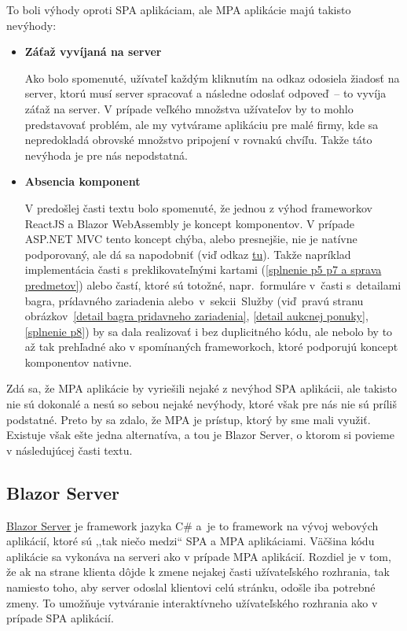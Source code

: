 To boli výhody oproti SPA aplikáciam, ale MPA aplikácie majú takisto nevýhody:

\begin{itemize}
\item \textbf{Záťaž vyvíjaná na server}

Ako bolo spomenuté, užívateľ každým kliknutím na odkaz odosiela žiadosť na server, ktorú musí server spracovať a následne odoslať odpoveď~-- to vyvíja záťaž na server. V prípade veľkého množstva užívateľov by to mohlo predstavovať problém, ale my vytvárame aplikáciu pre malé firmy, kde sa nepredokladá obrovské množstvo pripojení v rovnakú chvíľu. Takže táto nevýhoda je pre nás nepodstatná.

\item \textbf{Absencia komponent}

V predošlej časti textu bolo spomenuté, že jednou z výhod frameworkov ReactJS a Blazor WebAssembly je koncept komponentov. V prípade ASP.NET MVC tento koncept chýba, alebo presnejšie, nie je natívne podporovaný, ale dá sa napodobniť (viď odkaz \href{https://stackoverflow.com/questions/23518499/creating-reusable-html-view-components-using-razor-in-asp-net-mvc}{tu}). Takže napríklad implementácia časti s preklikovateľnými kartami (\ref{splnenie p5 p7 a sprava predmetov}) alebo častí, ktoré sú totožné, napr.~formuláre v~časti s~detailami bagra, prídavného zariadenia alebo~v~sekcii~Služby (viď~pravú stranu obrázkov~\ref{detail bagra pridavneho zariadenia}, \ref{detail aukcnej ponuky}, \ref{splnenie p8}) by sa dala realizovať i bez duplicitného kódu, ale nebolo by to až tak prehľadné ako v spomínaných frameworkoch, ktoré podporujú koncept komponentov nativne.
\end{itemize}

Zdá sa, že MPA aplikácie by vyriešili nejaké z nevýhod SPA aplikácii, ale takisto nie sú dokonalé a nesú so sebou nejaké nevýhody, ktoré však pre nás nie sú príliš podstatné. Preto by sa zdalo, že MPA je prístup, ktorý by sme mali využiť. Existuje však ešte jedna alternatíva, a tou je Blazor Server, o ktorom si povieme v následujúcej časti textu.

\subsection{Blazor Server}

\href{https://learn.microsoft.com/en-us/aspnet/core/blazor/hosting-models?view=aspnetcore-7.0\#blazor-server}{Blazor Server} je framework jazyka C\# a~je to framework na vývoj webových aplikácií, ktoré sú ,,tak niečo medzi`` SPA a MPA aplikáciami. Väčšina kódu aplikácie sa vykonáva na serveri ako v prípade MPA aplikácií. Rozdiel je v tom, že ak na strane klienta dôjde k zmene nejakej časti užívateľského rozhrania, tak namiesto toho, aby server odoslal klientovi celú stránku, odošle iba potrebné zmeny. To umožňuje vytváranie interaktívneho užívateľského rozhrania ako v prípade SPA aplikácií.

